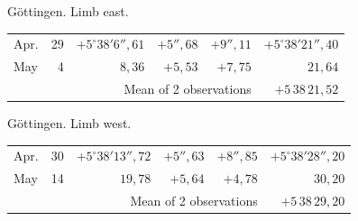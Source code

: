 \noindent\begin{minipage}[t]{.495\textwidth}\centering Göttingen. Limb east.\par\smallskip
{\scriptsize\setlength{\tabcolsep}{1pt}\renewcommand{\arraystretch}{1.2}\begin{tabular}{lr|r|r|r|r|}
Apr.&29&$+5^\circ38'6''{,}61$&$+5''{,}68$&$+9''{,}11$&$+5^\circ38'21''{,}40$\\
May&4&$8{,}36$&$+5{,}53$&$+7{,}75$&$21{,}64$\\
\cline{6-6}\multicolumn{5}{r}{Mean of 2 observations}&$+5\,38\,21{,}52$
\end{tabular}}\end{minipage}\hfill\begin{minipage}[t]{.495\textwidth}\centering Göttingen. Limb west.\par\smallskip
{\scriptsize\setlength{\tabcolsep}{1pt}\renewcommand{\arraystretch}{1.2}\begin{tabular}{lr|r|r|r|r}
Apr.&30&$+5^\circ38'13''{,}72$&$+5''{,}63$&$+8''{,}85$&$+5^\circ38'28''{,}20$\\
May&14&$19{,}78$&$+5{,}64$&$+4{,}78$&$30{,}20$\\
\cline{6-6}\multicolumn{5}{r}{Mean of 2 observations}&$+5\,38\,29{,}20$
\end{tabular}}\end{minipage}
\par\vspace{4mm}


